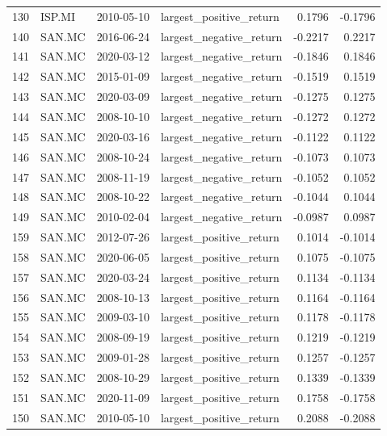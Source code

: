 \begin{table}
\begin{tabular}{llllrr}
130 & ISP.MI & 2010-05-10 & largest_positive_return & 0.1796 & -0.1796 \\
140 & SAN.MC & 2016-06-24 & largest_negative_return & -0.2217 & 0.2217 \\
141 & SAN.MC & 2020-03-12 & largest_negative_return & -0.1846 & 0.1846 \\
142 & SAN.MC & 2015-01-09 & largest_negative_return & -0.1519 & 0.1519 \\
143 & SAN.MC & 2020-03-09 & largest_negative_return & -0.1275 & 0.1275 \\
144 & SAN.MC & 2008-10-10 & largest_negative_return & -0.1272 & 0.1272 \\
145 & SAN.MC & 2020-03-16 & largest_negative_return & -0.1122 & 0.1122 \\
146 & SAN.MC & 2008-10-24 & largest_negative_return & -0.1073 & 0.1073 \\
147 & SAN.MC & 2008-11-19 & largest_negative_return & -0.1052 & 0.1052 \\
148 & SAN.MC & 2008-10-22 & largest_negative_return & -0.1044 & 0.1044 \\
149 & SAN.MC & 2010-02-04 & largest_negative_return & -0.0987 & 0.0987 \\
159 & SAN.MC & 2012-07-26 & largest_positive_return & 0.1014 & -0.1014 \\
158 & SAN.MC & 2020-06-05 & largest_positive_return & 0.1075 & -0.1075 \\
157 & SAN.MC & 2020-03-24 & largest_positive_return & 0.1134 & -0.1134 \\
156 & SAN.MC & 2008-10-13 & largest_positive_return & 0.1164 & -0.1164 \\
155 & SAN.MC & 2009-03-10 & largest_positive_return & 0.1178 & -0.1178 \\
154 & SAN.MC & 2008-09-19 & largest_positive_return & 0.1219 & -0.1219 \\
153 & SAN.MC & 2009-01-28 & largest_positive_return & 0.1257 & -0.1257 \\
152 & SAN.MC & 2008-10-29 & largest_positive_return & 0.1339 & -0.1339 \\
151 & SAN.MC & 2020-11-09 & largest_positive_return & 0.1758 & -0.1758 \\
150 & SAN.MC & 2010-05-10 & largest_positive_return & 0.2088 & -0.2088 \\
\bottomrule
\end{tabular}
\end{table}
